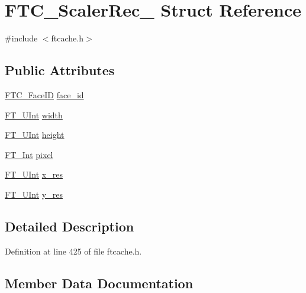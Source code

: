 \hypertarget{struct_f_t_c___scaler_rec__}{}\section{F\+T\+C\+\_\+\+Scaler\+Rec\+\_\+ Struct Reference}
\label{struct_f_t_c___scaler_rec__}


{\ttfamily \#include $<$ftcache.\+h$>$}

\subsection*{Public Attributes}
\begin{DoxyCompactItemize}
\item 
\mbox{\hyperlink{ftcache_8h_a5da66c12c497bf5888638100876c7197}{F\+T\+C\+\_\+\+Face\+ID}} \mbox{\hyperlink{struct_f_t_c___scaler_rec___a8e963aa619409e646558fe7aa272e81f}{face\+\_\+id}}
\item 
\mbox{\hyperlink{fttypes_8h_abcb8db4dbf35d2b55a9e8c7b0926dc52}{F\+T\+\_\+\+U\+Int}} \mbox{\hyperlink{struct_f_t_c___scaler_rec___a11e13d907ca4661bf7c1d98fffecf321}{width}}
\item 
\mbox{\hyperlink{fttypes_8h_abcb8db4dbf35d2b55a9e8c7b0926dc52}{F\+T\+\_\+\+U\+Int}} \mbox{\hyperlink{struct_f_t_c___scaler_rec___a9b3a9b4d7148bbaa4daaae1e1fbb2dbc}{height}}
\item 
\mbox{\hyperlink{fttypes_8h_af90e5fb0d07e21be9fe6faa33f02484c}{F\+T\+\_\+\+Int}} \mbox{\hyperlink{struct_f_t_c___scaler_rec___ab78868341e2d66f17e6f1d77e9e054d2}{pixel}}
\item 
\mbox{\hyperlink{fttypes_8h_abcb8db4dbf35d2b55a9e8c7b0926dc52}{F\+T\+\_\+\+U\+Int}} \mbox{\hyperlink{struct_f_t_c___scaler_rec___a886c7c1230dc5d5e6b3fc32d06274752}{x\+\_\+res}}
\item 
\mbox{\hyperlink{fttypes_8h_abcb8db4dbf35d2b55a9e8c7b0926dc52}{F\+T\+\_\+\+U\+Int}} \mbox{\hyperlink{struct_f_t_c___scaler_rec___accb53c7a9aeebb41c05f48d14d3dfe71}{y\+\_\+res}}
\end{DoxyCompactItemize}


\subsection{Detailed Description}


Definition at line 425 of file ftcache.\+h.



\subsection{Member Data Documentation}
\mbox{\label{struct_f_t_c___scaler_rec___a8e963aa619409e646558fe7aa272e81f}} 
